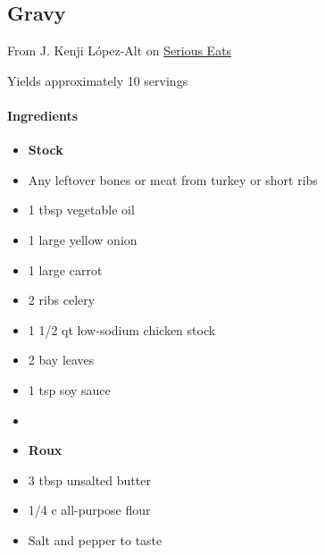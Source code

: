 \documentclass[12pt]{article}
\newenvironment*{ingredients}
	{
		\paragraph*{Ingredients}
		\begin{itemize}
	}
	{
		\end{itemize}
	}
\begin{document}
	\newpage
	
	\subsection{Gravy}
	From J. Kenji L\'{o}pez-Alt on \href{https://www.seriouseats.com/sous-vide-turkey-breast-crispy-skin-recipe-thanksgiving}{Serious Eats}
	
	Yields approximately 10 servings
	
	\begin{ingredients}
		\item[] \textbf{Stock}
		\item Any leftover bones or meat from turkey or short ribs
		\item 1 tbsp vegetable oil
		\item 1 large yellow onion
		\item 1 large carrot
		\item 2 ribs celery
		\item 1 1/2 qt low-sodium chicken stock
		\item 2 bay leaves
		\item 1 tsp soy sauce
		\item[] \hfill
		\item[] \textbf{Roux}
		\item 3 tbsp unsalted butter
		\item 1/4 c all-purpose flour
		\item Salt and pepper to taste
	\end{ingredients}
	
\end{document}
